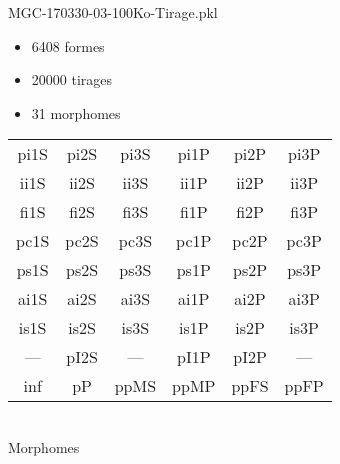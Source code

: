 MGC-170330-03-100Ko-Tirage.pkl
\begin{itemize}
\item 6408 formes
\item 20000 tirages
\item 31 morphomes
\end{itemize}
\begin{center}
\begin{tabular}{cccccc}
\hline
\cellcolor{white}pi1S & \cellcolor{orange}pi2S & \cellcolor{orange}pi3S & \cellcolor{white}pi1P & \cellcolor{white}pi2P & \cellcolor{white}pi3P\\
\cellcolor{brown}ii1S & \cellcolor{brown}ii2S & \cellcolor{brown}ii3S & \cellcolor{white}ii1P & \cellcolor{white}ii2P & \cellcolor{brown}ii3P\\
\cellcolor{yellow}fi1S & \cellcolor{lime}fi2S & \cellcolor{lime}fi3S & \cellcolor{green}fi1P & \cellcolor{white}fi2P & \cellcolor{green}fi3P\\
\cellcolor{yellow}pc1S & \cellcolor{yellow}pc2S & \cellcolor{yellow}pc3S & \cellcolor{white}pc1P & \cellcolor{white}pc2P & \cellcolor{yellow}pc3P\\
\cellcolor{teal}ps1S & \cellcolor{white}ps2S & \cellcolor{teal}ps3S & \cellcolor{white}ps1P & \cellcolor{white}ps2P & \cellcolor{teal}ps3P\\
\cellcolor{white}ai1S & \cellcolor{lightgray}ai2S & \cellcolor{lightgray}ai3S & \cellcolor{white}ai1P & \cellcolor{black}ai2P & \cellcolor{white}ai3P\\
\cellcolor{black}is1S & \cellcolor{black}is2S & \cellcolor{lightgray}is3S & \cellcolor{black}is1P & \cellcolor{black}is2P & \cellcolor{white}is3P\\
--- & \cellcolor{white}pI2S & --- & \cellcolor{white}pI1P & \cellcolor{white}pI2P & ---\\
\cellcolor{white}inf & \cellcolor{white}pP & \cellcolor{white}ppMS & \cellcolor{white}ppMP & \cellcolor{magenta}ppFS & \cellcolor{magenta}ppFP\\
\hline
\end{tabular}\\
Morphomes
\end{center}
\bigskip

